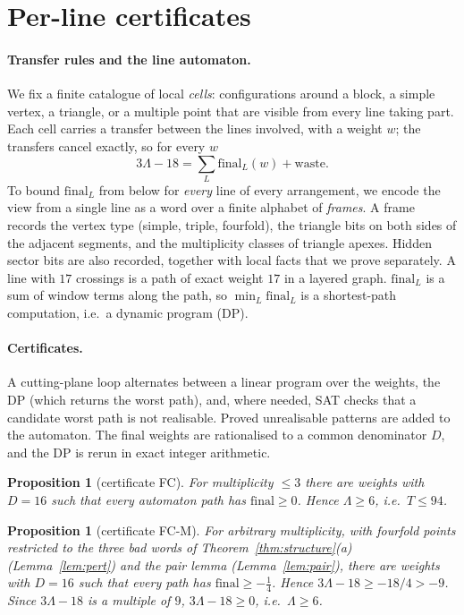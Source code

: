 \documentclass[11pt]{article}
\newtheorem{proposition}[theorem]{Proposition}
\theoremstyle{definition}
\theoremstyle{remark}
\newcommand{\Lam}{\Lambda}
\begin{document}
\section{Per-line certificates}\label{sec:cert}

\paragraph{Transfer rules and the line automaton.} We fix a finite catalogue of local \emph{cells}: configurations
around a block, a simple vertex, a triangle, or a multiple point that are visible from every line taking part. Each
cell carries a transfer between the lines involved, with a weight $w$; the transfers cancel exactly, so for every $w$
\[
3\Lam-18=\sum_L \mathrm{final}_L(w)+\mathrm{waste}.
\]
To bound $\mathrm{final}_L$ from below for \emph{every} line of every arrangement, we encode the view from a single
line as a word over a finite alphabet of \emph{frames}. A frame records the vertex type (simple, triple, fourfold),
the triangle bits on both sides of the adjacent segments, and the multiplicity classes of triangle apexes. Hidden
sector bits are also recorded, together with local facts that we prove separately. A line with $17$ crossings is a
path of exact weight $17$ in a layered graph. $\mathrm{final}_L$ is a sum of window terms along the path, so
$\min_L\mathrm{final}_L$ is a shortest-path computation, i.e.\ a dynamic program (DP).

\paragraph{Certificates.} A cutting-plane loop alternates between a linear program over the weights, the DP (which
returns the worst path), and, where needed, SAT checks that a candidate worst path is not realisable. Proved
unrealisable patterns are added to the automaton. The final weights are rationalised to a common denominator $D$,
and the DP is rerun in exact integer arithmetic.

\begin{proposition}[certificate FC]\label{prop:fc}
For multiplicity $\le 3$ there are weights with $D=16$ such that every automaton path has
$\mathrm{final}\ge 0$. Hence $\Lam\ge 6$, i.e.\ $T\le 94$.
\end{proposition}

\begin{proposition}[certificate FC-M]\label{prop:fcm}
For arbitrary multiplicity, with fourfold points restricted to the three bad words of
Theorem~\ref{thm:structure}(a) (Lemma~\ref{lem:pert}) and the pair lemma (Lemma~\ref{lem:pair}), there are weights
with $D=16$ such that every path has $\mathrm{final}\ge -\tfrac14$. Hence $3\Lam-18\ge -18/4>-9$. Since $3\Lam-18$ is
a multiple of $9$, $3\Lam-18\ge 0$, i.e.\ $\Lam\ge 6$.
\end{proposition}
\end{document}
